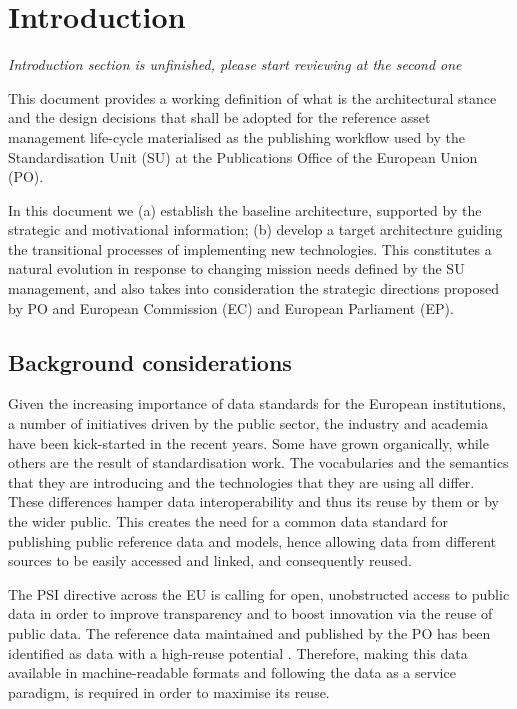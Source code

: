 \section{Introduction}
\label{sec:introduction}
	
	\textit{Introduction section is unfinished, please start reviewing at the second one}
	
	This document provides a working definition of what is the architectural stance and the design decisions that shall be adopted for the reference asset management life-cycle materialised as the publishing workflow used by the Standardisation Unit (SU) at the Publications Office of the European Union (PO).
	
	In this document we (a) establish the baseline architecture, supported by the strategic and motivational information; (b) develop a target architecture guiding the transitional processes of implementing new technologies. This constitutes a natural evolution in response to changing mission needs defined by the SU management, and also takes into consideration the strategic directions proposed by PO and European Commission (EC) and European Parliament (EP).
	
	
	\subsection{Background considerations}
	
	Given the increasing importance of data standards for the European institutions, a number of initiatives driven by the public sector, the industry and academia have been kick-started in the recent years. Some have grown organically, while others are the result of standardisation work. The vocabularies and the semantics that they are introducing and the technologies that they are using all differ. These differences hamper data interoperability and thus its reuse by them or by the wider public. This creates the need for a common data standard for publishing public reference data and models, hence allowing data from different sources to be easily accessed and linked, and consequently reused.
	
	The PSI directive \cite{directive-2013/37/EU} across the EU is calling for open, unobstructed access to public data in order to improve transparency and to boost innovation via the reuse of public data. The reference data maintained and published by the PO has been identified as data with a high-reuse potential \cite{d-high-value-assets}. Therefore, making this data available in machine-readable formats and following the data as a service paradigm, is required in order to maximise its reuse.
	
